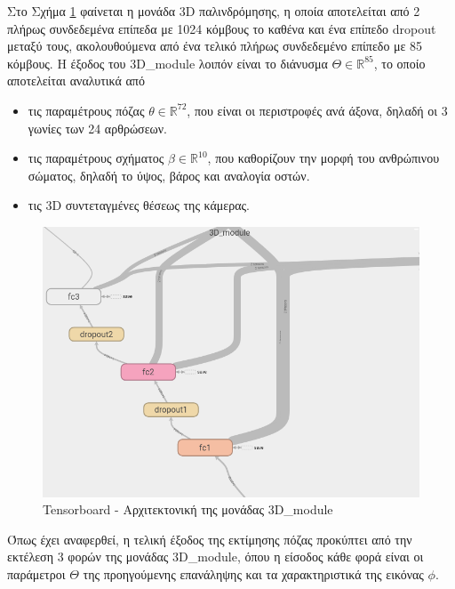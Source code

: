 Στο Σχήμα \ref{fig:3d_module} φαίνεται η μονάδα 3D παλινδρόμησης, η οποία αποτελείται από 2 πλήρως συνδεδεμένα επίπεδα με 1024 κόμβους το καθένα και ένα επίπεδο dropout μεταξύ τους, ακολουθούμενα από ένα τελικό πλήρως συνδεδεμένο επίπεδο με 85 κόμβους. Η έξοδος του 3D\_module λοιπόν είναι το διάνυσμα $\Theta \in \mathbb{R}^{85}$, το οποίο αποτελείται αναλυτικά από 

\begin{itemize}
	\item τις παραμέτρους πόζας $\theta \in \mathbb{R}^{72}$, που είναι οι περιστροφές ανά άξονα, δηλαδή οι 3 γωνίες των 24 αρθρώσεων.
	\item τις παραμέτρους σχήματος $\beta \in \mathbb{R}^{10}$, που καθορίζουν την μορφή του ανθρώπινου σώματος, δηλαδή το ύψος, βάρος και αναλογία οστών.
	\item τις 3D συντεταγμένες θέσεως της κάμερας.
\end{itemize}

\begin{figure}[H]
	\centering
	\includegraphics[scale=0.5]{images/chapter3/3d_module.png}
	\caption{Tensorboard - Αρχιτεκτονική της μονάδας 3D\_module}
	\label{fig:3d_module}
\end{figure}

Όπως έχει αναφερθεί, η τελική έξοδος της εκτίμησης πόζας προκύπτει από την εκτέλεση 3 φορών της μονάδας 3D\_module, όπου η είσοδος κάθε φορά είναι οι παράμετροι $\Theta$ της προηγούμενης επανάληψης και τα χαρακτηριστικά της εικόνας $\phi$.